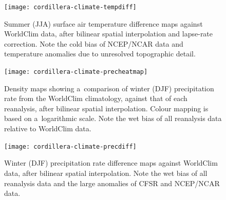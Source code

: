 \documentclass[tc, ms]{copernicus}
\begin{document}
\begin{figure}
  \texttt{[image: cordillera-climate-tempdiff]}
  \caption{Summer (JJA) surface air temperature difference maps against WorldClim data, after bilinear spatial interpolation and lapse-rate correction. Note the cold bias of NCEP/NCAR data and temperature anomalies due to unresolved topographic detail.}
  \label{fig:tempdiff}
\end{figure}

\begin{figure}
  \texttt{[image: cordillera-climate-precheatmap]}
  \caption{Density maps showing a~comparison of winter (DJF) precipitation rate from the WorldClim climatology, against that of each reanalysis, after bilinear spatial interpolation. Colour mapping is based on a~logarithmic scale. Note the wet bias of all reanalysis data relative to WorldClim data.}
  \label{fig:precheatmap}
\end{figure}

\begin{figure}
  \texttt{[image: cordillera-climate-precdiff]}
  \caption{Winter (DJF) precipitation rate difference maps against WorldClim data, after bilinear spatial interpolation. Note the wet bias of all reanalysis data and the large anomalies of CFSR and NCEP/NCAR data.}
  \label{fig:precdiff}
\end{figure}
\end{document}
